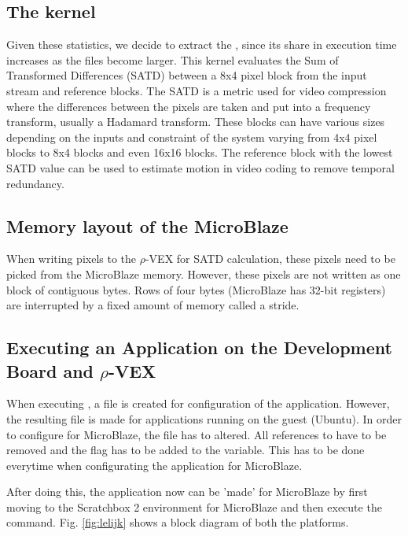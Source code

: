 \subsection{The  kernel}
\label{sec:kernel}
Given these statistics, we decide to extract the , since its share in execution time increases as the files become larger. This kernel evaluates the Sum of Transformed Differences (SATD) between a 8x4 pixel block from the input stream and reference blocks. The SATD is a metric used for video compression where the differences between the pixels are taken and put into a frequency transform, usually a Hadamard transform. These blocks can have various sizes depending on the inputs and constraint of the system varying from 4x4 pixel blocks to 8x4 blocks and even 16x16 blocks. The reference block with the lowest SATD value can be used to estimate motion in video coding to remove temporal redundancy. 

\subsection{Memory layout of the MicroBlaze}
\label{sec:layout}
When writing pixels to the $\rho$-VEX for SATD calculation, these pixels need to be picked from the MicroBlaze memory. However, these pixels are not written as one block of contiguous bytes. Rows of four bytes (MicroBlaze has 32-bit registers) are interrupted by a fixed amount of memory called a stride.

\subsection{Executing an Application on the Development Board and $\rho$-VEX}
\label{sec:executing}
When executing , a file is created for configuration of the application. However, the resulting  file is made for applications running on the guest (Ubuntu). In order to configure for MicroBlaze, the  file has to altered. All references to  have to be removed and the  flag has to be added to the  variable. This has to be done everytime when configurating the application for MicroBlaze.

After doing this, the application now can be 'made' for MicroBlaze by first moving to the Scratchbox 2 environment for MicroBlaze and then execute the  command. Fig. \ref{fig:lelijk} shows a block diagram of both the platforms.

